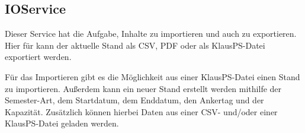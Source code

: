 \subsection{IOService}\label{subsec:ioservice}
Dieser Service hat die Aufgabe, Inhalte zu importieren und auch zu exportieren.
Hier für kann der aktuelle Stand als CSV, PDF oder als KlausPS-Datei exportiert werden.

Für das Importieren gibt es die Möglichkeit aus einer KlausPS-Datei einen Stand zu importieren.
Außerdem kann ein neuer Stand erstellt werden mithilfe der Semester-Art, dem Startdatum, dem Enddatum, den Ankertag und der Kapazität.
Zusätzlich können hierbei Daten aus einer CSV- und/oder einer KlausPS-Datei geladen werden.

